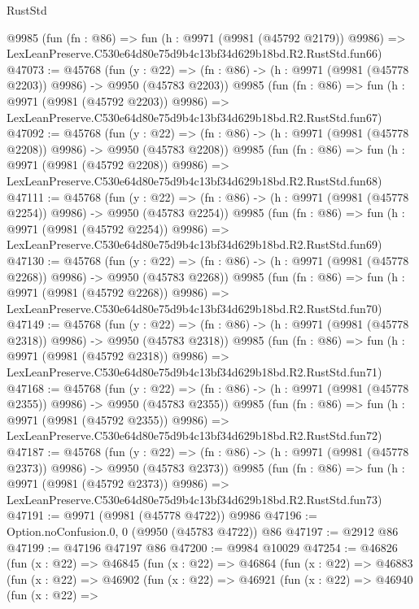 \begin{lexlean}{RustStd}
\begin{coremodule}
    @9985
    (fun (fn : @86) =>
    fun (h : @9971 (@9981 (@45792 @2179)) @9986) =>
    LexLeanPreserve.C530e64d80e75d9b4c13bf34d629b18bd.R2.RustStd.fun66)
@47073 := @45768
    (fun (y : @22) =>
    (fn : @86) -> (h : @9971 (@9981 (@45778 @2203)) @9986) -> @9950 (@45783 @2203))
    @9985
    (fun (fn : @86) =>
    fun (h : @9971 (@9981 (@45792 @2203)) @9986) =>
    LexLeanPreserve.C530e64d80e75d9b4c13bf34d629b18bd.R2.RustStd.fun67)
@47092 := @45768
    (fun (y : @22) =>
    (fn : @86) -> (h : @9971 (@9981 (@45778 @2208)) @9986) -> @9950 (@45783 @2208))
    @9985
    (fun (fn : @86) =>
    fun (h : @9971 (@9981 (@45792 @2208)) @9986) =>
    LexLeanPreserve.C530e64d80e75d9b4c13bf34d629b18bd.R2.RustStd.fun68)
@47111 := @45768
    (fun (y : @22) =>
    (fn : @86) -> (h : @9971 (@9981 (@45778 @2254)) @9986) -> @9950 (@45783 @2254))
    @9985
    (fun (fn : @86) =>
    fun (h : @9971 (@9981 (@45792 @2254)) @9986) =>
    LexLeanPreserve.C530e64d80e75d9b4c13bf34d629b18bd.R2.RustStd.fun69)
@47130 := @45768
    (fun (y : @22) =>
    (fn : @86) -> (h : @9971 (@9981 (@45778 @2268)) @9986) -> @9950 (@45783 @2268))
    @9985
    (fun (fn : @86) =>
    fun (h : @9971 (@9981 (@45792 @2268)) @9986) =>
    LexLeanPreserve.C530e64d80e75d9b4c13bf34d629b18bd.R2.RustStd.fun70)
@47149 := @45768
    (fun (y : @22) =>
    (fn : @86) -> (h : @9971 (@9981 (@45778 @2318)) @9986) -> @9950 (@45783 @2318))
    @9985
    (fun (fn : @86) =>
    fun (h : @9971 (@9981 (@45792 @2318)) @9986) =>
    LexLeanPreserve.C530e64d80e75d9b4c13bf34d629b18bd.R2.RustStd.fun71)
@47168 := @45768
    (fun (y : @22) =>
    (fn : @86) -> (h : @9971 (@9981 (@45778 @2355)) @9986) -> @9950 (@45783 @2355))
    @9985
    (fun (fn : @86) =>
    fun (h : @9971 (@9981 (@45792 @2355)) @9986) =>
    LexLeanPreserve.C530e64d80e75d9b4c13bf34d629b18bd.R2.RustStd.fun72)
@47187 := @45768
    (fun (y : @22) =>
    (fn : @86) -> (h : @9971 (@9981 (@45778 @2373)) @9986) -> @9950 (@45783 @2373))
    @9985
    (fun (fn : @86) =>
    fun (h : @9971 (@9981 (@45792 @2373)) @9986) =>
    LexLeanPreserve.C530e64d80e75d9b4c13bf34d629b18bd.R2.RustStd.fun73)
@47191 := @9971 (@9981 (@45778 @4722)) @9986
@47196 := Option.noConfusion.{0, 0} (@9950 (@45783 @4722)) @86
@47197 := @2912 @86
@47199 := @47196 @47197 @86
@47200 := @9984 @10029
@47254 := @46826
    (fun (x : @22) =>
    @46845
      (fun (x : @22) =>
      @46864
        (fun (x : @22) =>
        @46883
          (fun (x : @22) =>
          @46902
            (fun (x : @22) =>
            @46921
              (fun (x : @22) =>
              @46940
                (fun (x : @22) =>

\end{coremodule}
\end{lexlean}
